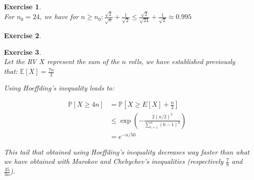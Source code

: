 \documentclass{article}
\newtheorem{exo}{Exercise}
\def\P{\mathbb{P}}
\def\E{\mathbb{E}}
\begin{document}
\begin{exo}{\ \\}
For $n_0  = 24$, we have for 
$n \geq n_0: 
\frac{\sqrt{2}}{\sqrt{n}} + \frac{1}{\sqrt{2}} 
\leq \frac{\sqrt{2}}{\sqrt{24}} + \frac{1}{\sqrt{2}} 
\approx 0.995 $

\end{exo}

\begin{exo}{\ \\}


\end{exo}

\begin{exo}{\ \\}
Let the RV $X$ represent the sum of the $n$ rolls, we have established previously that: $\E[X] = \frac{7n}{2}$


Using Hoeffding's inequality leads to:

\begin{align*}
    \P[X \geq 4n] 
    &= \P[X \geq E[X]+ \frac{n}{2} ] \\
    &\leq \exp{\left(-\frac{2 (n/2)^2}{\sum^{n}_{i=1} (6-1)^2}\right)} \\
    &= e^{-n/50} 
\end{align*}

This tail that obtained using Hoeffding's inequality decreases way faster than what we have obtained with Marokov and Chebychev's inequalities (respectively $\frac{7}{8}$ and $\frac{35}{3n}$).

\end{exo}
\end{document}
